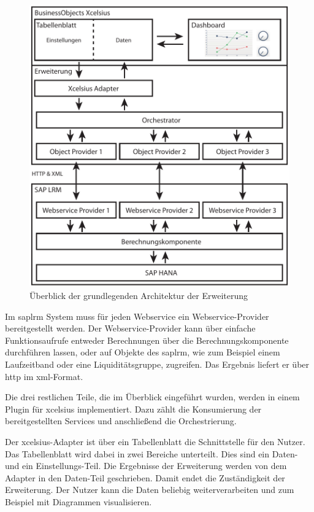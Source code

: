 \begin{onehalfspacing}
\begin{figure}[ht]
\centering
\setlength{\unitlength}{1mm}
\includegraphics[width=15cm]{images/Abbildung11-Architektur-Erweiterung.pdf}
\caption{Überblick der grundlegenden Architektur der Erweiterung\label{fig:ueberblick-architektur}}
\end{figure}

Im \gls{saplrm} System muss für jeden Webservice ein Webservice-Provider bereitgestellt werden. Der Webservice-Provider kann über einfache Funktionsaufrufe entweder Berechnungen über die Berechnungskomponente durchführen lassen, oder auf Objekte des \gls{saplrm}, wie zum Beispiel einem Laufzeitband oder eine Liquiditätsgruppe, zugreifen. Das Ergebnis liefert er über \gls{http} im \gls{xml}-Format.

Die drei restlichen Teile, die im Überblick eingeführt wurden, werden in einem Plugin für \gls{xcelsius} implementiert. Dazu zählt die Konsumierung der bereitgestellten Services und anschließend die Orchestrierung.

Der \gls{xcelsius}-Adapter ist über ein Tabellenblatt die Schnittstelle für den Nutzer. Das Tabellenblatt wird dabei in zwei Bereiche unterteilt. Dies sind ein Daten- und ein Ein\-stel\-lungs-Teil. Die Ergebnisse der Erweiterung werden von dem Adapter in den Daten-Teil geschrieben. Damit endet die Zuständigkeit der Erweiterung. Der Nutzer kann die Daten beliebig weiterverarbeiten und zum Beispiel mit Diagrammen visualisieren.


\end{onehalfspacing}
